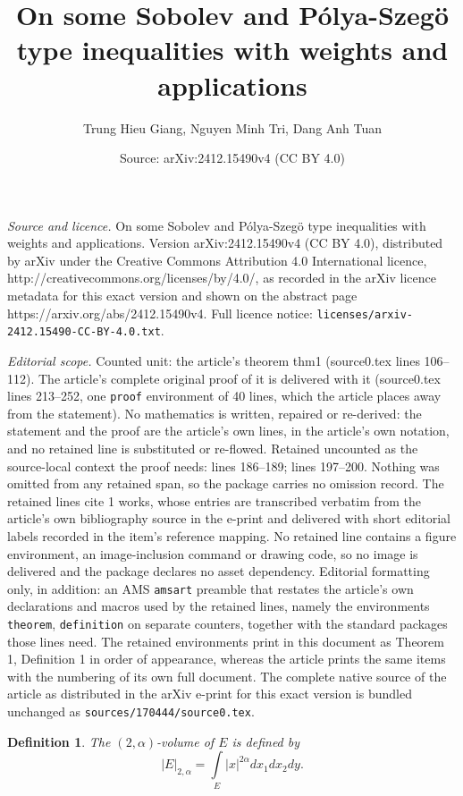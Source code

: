 \documentclass[10pt,a4paper]{amsart}
\title{On some Sobolev and P\'olya-Szeg\"o type inequalities with weights and applications}
\author{Trung Hieu Giang, Nguyen Minh Tri, Dang Anh Tuan}
\date{Source: arXiv:2412.15490v4 (CC BY 4.0)}
\newtheorem{definition}{Definition}
\begin{document}
\maketitle

\noindent\emph{Source and licence.} On some Sobolev and P\'olya-Szeg\"o type inequalities with weights and applications. Version arXiv:2412.15490v4 (CC BY 4.0), distributed by arXiv under the Creative Commons Attribution 4.0 International licence, http://creativecommons.org/licenses/by/4.0/, as recorded in the arXiv licence metadata for this exact version and shown on the abstract page https://arxiv.org/abs/2412.15490v4. Full licence notice: \texttt{licenses/arxiv-2412.15490-CC-BY-4.0.txt}.\par\smallskip

\noindent\textit{Editorial scope.} Counted unit: the article's theorem thm1 (source0.tex lines 106--112). The article's complete original proof of it is delivered with it (source0.tex lines 213--252, one \texttt{proof} environment of 40 lines, which the article places away from the statement). No mathematics is written, repaired or re-derived: the statement and the proof are the article's own lines, in the article's own notation, and no retained line is substituted or re-flowed.  Retained uncounted as the source-local context the proof needs: lines 186--189; lines 197--200.  Nothing was omitted from any retained span, so the package carries no omission record.  The retained lines cite 1 works, whose entries are transcribed verbatim from the article's own bibliography source in the e-print and delivered with short editorial labels recorded in the item's reference mapping.  No retained line contains a figure environment, an image-inclusion command or drawing code, so no image is delivered and the package declares no asset dependency.  Editorial formatting only, in addition: an AMS \texttt{amsart} preamble that restates the article's own declarations and macros used by the retained lines, namely the environments \texttt{theorem}, \texttt{definition} on separate counters, together with the standard packages those lines need.  The retained environments print in this document as Theorem 1, Definition 1 in order of appearance, whereas the article prints the same items with the numbering of its own full document.  The complete native source of the article as distributed in the arXiv e-print for this exact version is bundled unchanged as \texttt{sources/170444/source0.tex}.
	\begin{definition}\label{def1}
		The $(2,\alpha)$-volume of $E$ is defined by
		$$ |E|_{2,\alpha} = \int\limits_E |x|^{2\alpha} dx_1dx_2 dy.$$ 
	\end{definition}
\end{document}
